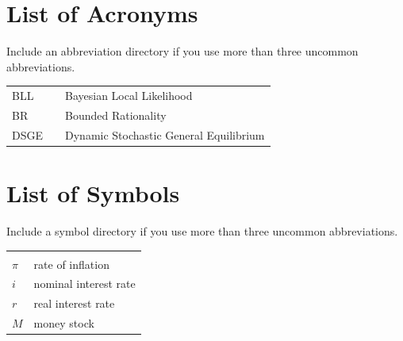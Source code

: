 \documentclass[11pt,a4paper]{article}
\begin{document}
\section*{List of Acronyms} %
\rule[0pt]{0mm}{10pt}
\noindent Include an abbreviation directory if you use more than three uncommon abbreviations.\\

\begin{tabular}{l l l}


	BLL && Bayesian Local Likelihood\\
	BR&&Bounded Rationality\\
	DSGE&&Dynamic Stochastic General Equilibrium\\


\end{tabular}

\newpage

\section*{List of Symbols} 
\noindent Include a symbol directory if you use more than three uncommon abbreviations.
	\begin{tabular}{l l}
		\textbf{} & \\
		$\pi$ & rate of inflation\\
		$i$ & nominal interest rate \\
		$r$ & real interest rate \\
		$M$ & money stock \\


	\end{tabular}\\ \vspace{1cm}

								
		
		


\newpage


\pagestyle{fancy}						
\fancyhf{}								
\fancyhead[R]{}							 
\renewcommand{\headrulewidth}{0pt}	 
\fancyfoot[R]{\thepage}				 
\renewcommand{\footrulewidth}{0pt}	 
\onehalfspacing	
\end{document}
